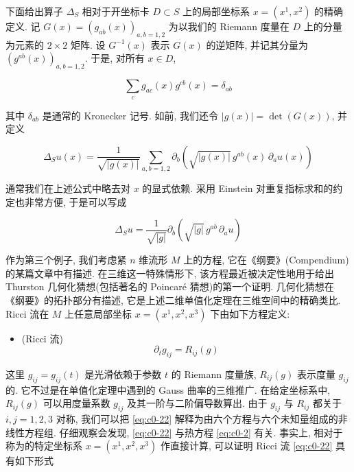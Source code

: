 下面给出算子 $\Delta_{S}$ 相对于开坐标卡 $D \subset S$ 上的局部坐标系 $x = (x^{1}, x^{2})$ 的精确定义.
记 $G(x) = (g_{a b}(x))_{a, b = 1, 2}$ 为以我们的 Riemann 度量在 $D$ 上的分量为元素的 $2 \times 2$ 矩阵.
设 $G^{-1}(x)$ 表示 $G(x)$ 的逆矩阵, 并记其分量为 $(g^{a b}(x))_{a, b = 1, 2}$.
于是, 对所有 $x \in D$,

\[
\sum_{c} g_{a c}(x) g^{c b}(x) = \delta_{a b}
\]

其中 $\delta_{a b}$ 是通常的 Kronecker 记号.
如前, 我们还令 $|g(x)| = \det(G(x))$, 并定义

\[
\Delta_{S} u(x) = \frac{1}{\sqrt{|g(x)|}} \sum_{a, b = 1, 2} \partial_{b}\left(\sqrt{|g(x)|}\, g^{a b}(x)\, \partial_{a} u(x)\right)
\]

通常我们在上述公式中略去对 $x$ 的显式依赖.
采用 Einstein 对重复指标求和的约定也非常方便, 于是可以写成

\begin{equation}\label{eq:c0-21}
\Delta_{S} u = \frac{1}{\sqrt{|g|}} \partial_{b}\left(\sqrt{|g|}\, g^{a b}\, \partial_{a} u\right)
\end{equation}

作为第三个例子, 我们考虑紧 $n$ 维流形 $M$ 上的方程, 它在《纲要》(Compendium)的某篇文章中有描述.
在三维这一特殊情形下, 该方程最近被决定性地用于给出 Thurston 几何化猜想(包括著名的 Poincaré 猜想)的第一个证明.
几何化猜想在《纲要》的拓扑部分有描述, 它是上述二维单值化定理在三维空间中的精确类比.
Ricci 流在 $M$ 上任意局部坐标 $x = (x^{1}, x^{2}, x^{3})$ 下由如下方程定义:

\begin{itemize}
\item (Ricci 流)
\begin{equation}\label{eq:c0-22}
\partial_{t} g_{i j} = R_{i j}(g)
\end{equation}
\end{itemize}

这里 $g_{i j} = g_{i j}(t)$ 是光滑依赖于参数 $t$ 的 Riemann 度量族, $R_{i j}(g)$ 表示度量 $g_{i j}$ 的.
它不过是在单值化定理中遇到的 Gauss 曲率的三维推广.
在给定坐标系中, $R_{i j}(g)$ 可以用度量系数 $g_{i j}$ 及其一阶与二阶偏导数算出.
由于 $g_{i j}$ 与 $R_{i j}$ 都关于 $i, j = 1, 2, 3$ 对称, 我们可以把 \eqref{eq:c0-22} 解释为由六个方程与六个未知量组成的非线性方程组.
仔细观察会发现, \eqref{eq:c0-22} 与热方程 \eqref{eq:c0-2} 有关.
事实上, 相对于称为的特定坐标系 $x = (x^{1}, x^{2}, x^{3})$ 作直接计算, 可以证明 Ricci 流 \eqref{eq:c0-22} 具有如下形式

